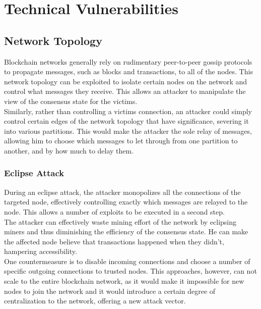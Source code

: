 \documentclass[12pt,a4paper]{article}
\begin{document}
\section{Technical Vulnerabilities}

\subsection{Network Topology}

Blockchain networks generally rely on rudimentary peer-to-peer gossip protocols to propagate messages, such as blocks and transactions, to all of the nodes. This network topology can be exploited to isolate certain nodes on the network and control what messages they receive. This allows an attacker to manipulate the view of the consensus state for the victims.\\

Similarly, rather than controlling a victims connection, an attacker could simply control certain edges of the network topology that have significance, severing it into various partitions. This would make the attacker the sole relay of messages, allowing him to choose which messages to let through from one partition to another, and by how much to delay them.\\

\subsubsection{Eclipse Attack}

During an eclipse attack, the attacker monopolizes all the connections of the targeted node, effectively controlling exactly which messages are relayed to the node. This allows a number of exploits to be executed in a second step.\\

The attacker can effectively waste mining effort of the network by eclipsing miners and thus diminishing the efficiency of the consensus state. He can make the affected node believe that transactions happened when they didn't, hampering accessibility.\\

One countermeasure is to disable incoming connections and choose a number of specific outgoing connections to trusted nodes. This approaches, however, can not scale to the entire blockchain network, as it would make it impossible for new nodes to join the network and it would introduce a certain degree of centralization to the network, offering a new attack vector.\\
\end{document}
